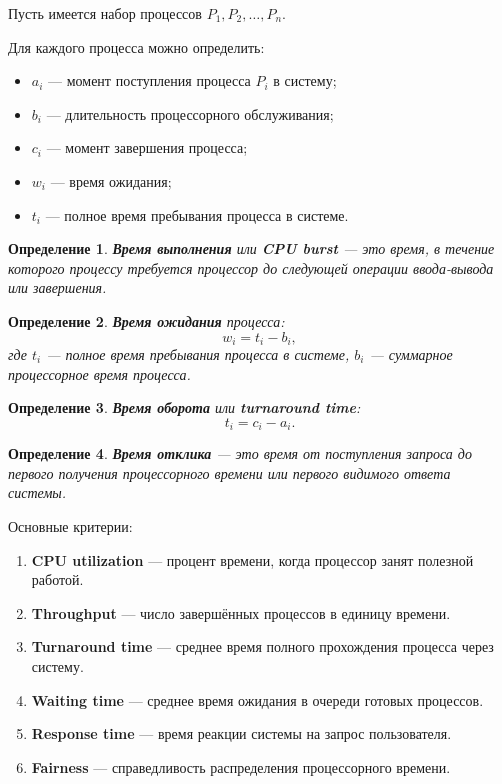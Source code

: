 \documentclass[12pt,a4paper]{article}
\newtheorem{definition}{Определение}
\begin{document}
Пусть имеется набор процессов $P_1, P_2, \dots, P_n$.

Для каждого процесса можно определить:

\begin{itemize}
    \item $a_i$ --- момент поступления процесса $P_i$ в систему;
    \item $b_i$ --- длительность процессорного обслуживания;
    \item $c_i$ --- момент завершения процесса;
    \item $w_i$ --- время ожидания;
    \item $t_i$ --- полное время пребывания процесса в системе.
\end{itemize}

\begin{definition}
\textbf{Время выполнения} или \textbf{CPU burst} --- это время, в течение которого процессу требуется процессор до следующей операции ввода-вывода или завершения.
\end{definition}

\begin{definition}
\textbf{Время ожидания} процесса:
\[
w_i = t_i - b_i,
\]
где $t_i$ --- полное время пребывания процесса в системе, $b_i$ --- суммарное процессорное время процесса.
\end{definition}

\begin{definition}
\textbf{Время оборота} или \textbf{turnaround time}:
\[
t_i = c_i - a_i.
\]
\end{definition}

\begin{definition}
\textbf{Время отклика} --- это время от поступления запроса до первого получения процессорного времени или первого видимого ответа системы.
\end{definition}

Основные критерии:

\begin{enumerate}
    \item \textbf{CPU utilization} --- процент времени, когда процессор занят полезной работой.
    \item \textbf{Throughput} --- число завершённых процессов в единицу времени.
    \item \textbf{Turnaround time} --- среднее время полного прохождения процесса через систему.
    \item \textbf{Waiting time} --- среднее время ожидания в очереди готовых процессов.
    \item \textbf{Response time} --- время реакции системы на запрос пользователя.
    \item \textbf{Fairness} --- справедливость распределения процессорного времени.
\end{enumerate}
\end{document}

